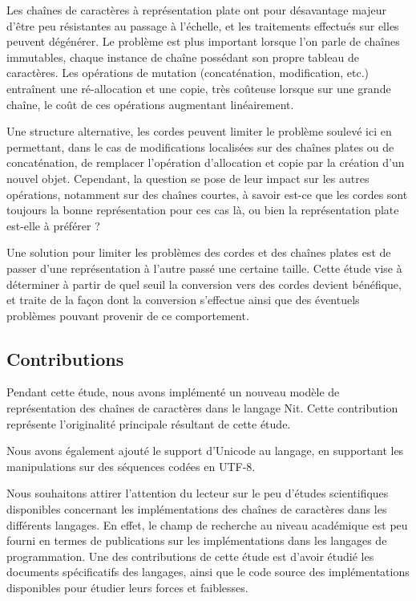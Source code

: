 \begin{introduction}
Les chaînes de caractères à représentation
plate ont pour désavantage majeur d'être peu résistantes au passage
à l'échelle, et les traitements effectués sur elles peuvent dégénérer.
Le problème est plus important lorsque l'on parle de chaînes immutables,
chaque instance de chaîne possédant son propre tableau de caractères.
Les opérations de mutation (concaténation, modification, etc.) entraînent
une ré-allocation et une copie, très coûteuse lorsque sur une grande
chaîne, le coût de ces opérations augmentant linéairement.

Une structure alternative, les cordes peuvent limiter le problème soulevé ici en permettant, dans le cas
de modifications localisées sur des chaînes plates ou de concaténation,
de remplacer l'opération d'allocation et copie par la création d'un nouvel objet.
Cependant, la question se pose de leur impact sur les autres opérations,
notamment sur des chaînes courtes, à savoir est-ce que les cordes sont
toujours la bonne représentation pour ces cas là, ou bien la représentation
plate est-elle à préférer ?

Une solution pour limiter les problèmes des cordes et des chaînes plates
est de passer d'une représentation à l'autre passé une certaine taille.
Cette étude vise à déterminer à partir de quel seuil la
conversion vers des cordes devient bénéfique, et traite de la façon
dont la conversion s'effectue ainsi que des éventuels problèmes
pouvant provenir de ce comportement.

\subsection{Contributions}

Pendant cette étude, nous avons implémenté un nouveau modèle de représentation
des chaînes de caractères dans le langage Nit.
Cette contribution représente l'originalité principale résultant de cette étude.

Nous avons également ajouté le support d'Unicode au langage, en supportant les
manipulations sur des séquences codées en UTF-8.

Nous souhaitons attirer l'attention du lecteur sur le peu d'études scientifiques
disponibles concernant les implémentations des chaînes de caractères dans les
différents langages.
En effet, le champ de recherche au niveau académique est peu fourni en termes de
publications sur les implémentations dans les langages de programmation.
Une des contributions de cette étude est d'avoir étudié les documents spécificatifs des langages,
ainsi que le code source des implémentations disponibles pour étudier leurs forces et faiblesses.


\end{introduction}
